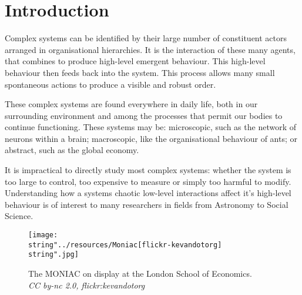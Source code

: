 \chapter{Introduction}
  
  
  Complex systems can be identified by their large number of constituent actors arranged in organisational hierarchies. It is the interaction of these many agents, that combines to produce high-level emergent behaviour. This high-level behaviour then feeds back into the system. This process allows many small spontaneous actions to produce a visible and robust order.
  
  These complex systems are found everywhere in daily life, both in our surrounding environment and among the processes that permit our bodies to continue functioning. These systems may be: microscopic, such as the network of neurons within a brain; macroscopic, like the organisational behaviour of ants; or abstract, such as the global economy.
  
  It is impractical to directly study most complex systems: whether the system is too large to control, too expensive to measure or simply too harmful to modify. Understanding how a systems chaotic low-level interactions affect it's high-level behaviour is of interest to many researchers in fields from Astronomy to Social Science.
\begin{wrapfigure}{O}{0.5\columnwidth}
  \begin{centering}
    \texttt{[image: \\string"../resources/Moniac[flickr-kevandotorg]\\string".jpg]}
  \par\end{centering}
  \protect\caption[The MONIAC on display at the London School of Economics.]{\label{fig:MONIAC}The MONIAC on display at the London School of Economics.\\ \em{CC by-nc 2.0, flickr:kevandotorg}}
\end{wrapfigure}

